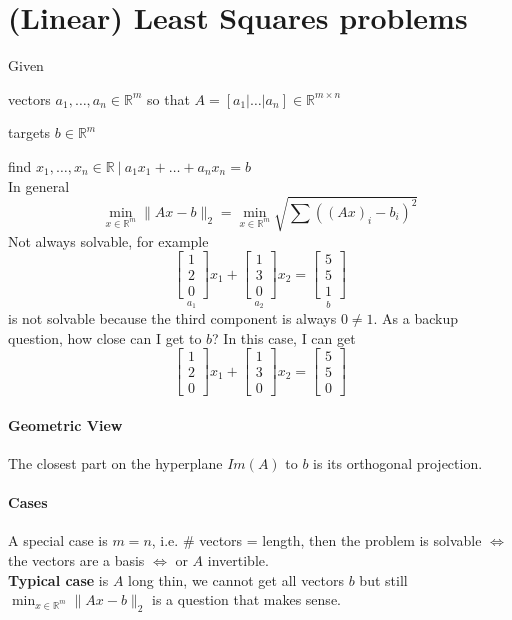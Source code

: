 \documentclass[10pt]{report}
\begin{document}
\section{(Linear) Least Squares problems}
Given 
\begin{list}{}{}
	\item vectors $a_1,\ldots,a_n\in \mathbb{R}^m$ so that $A = [a_1|\ldots|a_n]\in \mathbb{R}^{m\times n}$
	\item targets $b\in \mathbb{R}^m$
\end{list}
find $x_1,\ldots,x_n\in \mathbb{R}\:|\: a_1x_1 + \ldots + a_n x_n = b$\\
In general $$\min_{x\in \mathbb{R}^m} \|Ax - b\|_2 = \min_{x\in \mathbb{R}^m} \sqrt{\sum \left((Ax)_i - b_i\right)^2}$$
Not always solvable, for example $$\underset{a_1}{\left[\begin{array}{c}
1\\2\\0
\end{array}\right]}x_1 + \underset{a_2}{\left[\begin{array}{c}
1\\3\\0
\end{array}\right]}x_2 = \underset{b}{\left[\begin{array}{c}
5\\5\\1
\end{array}\right]}$$ is not solvable because the third component is always $0 \neq 1$. As a backup question, how close can I get to $b$? In this case, I can get $$\left[\begin{array}{c}
1\\2\\0
\end{array}\right]x_1 + \left[\begin{array}{c}
1\\3\\0
\end{array}\right]x_2 = \left[\begin{array}{c}
5\\5\\0
\end{array}\right]$$
\paragraph{Geometric View} The closest part on the hyperplane $Im(A)$ to $b$ is its orthogonal projection.
\paragraph{Cases} A special case is $m=n$, i.e. \# vectors = length, then the problem is solvable $\Leftrightarrow$ the vectors are a basis $\Leftrightarrow$ or $A$ invertible.\\
\textbf{Typical case} is $A$ long thin, we cannot get all vectors $b$ but still $\min_{x\in \mathbb{R}^m} \|Ax - b\|_2$ is a question that makes sense. 
\end{document}
